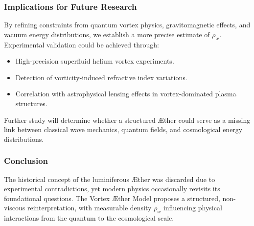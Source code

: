 \subsubsection*{Implications for Future Research}
By refining constraints from quantum vortex physics, gravitomagnetic effects, and vacuum energy distributions, we establish a more precise estimate of $ \rho_{\text{\ae}} $. Experimental validation could be achieved through:
\begin{itemize}
    \item High-precision superfluid helium vortex experiments.
    \item Detection of vorticity-induced refractive index variations.
    \item Correlation with astrophysical lensing effects in vortex-dominated plasma structures.
\end{itemize}
Further study will determine whether a structured Æther could serve as a missing link between classical wave mechanics, quantum fields, and cosmological energy distributions.

\subsubsection*{Conclusion}
The historical concept of the luminiferous Æther was discarded due to experimental contradictions, yet modern physics occasionally revisits its foundational questions. The Vortex Æther Model proposes a structured, non-viscous reinterpretation, with measurable density $ \rho_{\text{\ae}} $ influencing physical interactions from the quantum to the cosmological scale.


